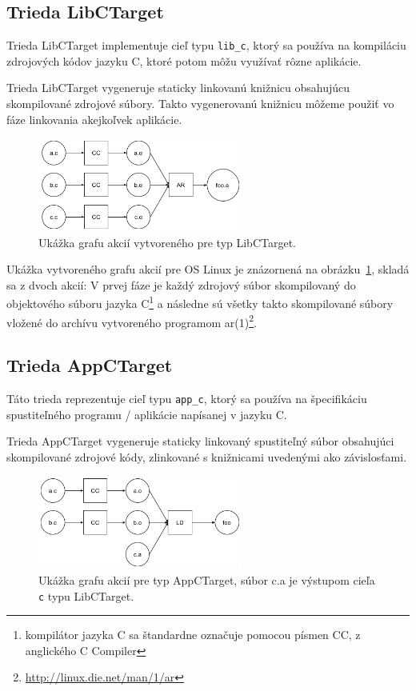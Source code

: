 \subsection{Trieda LibCTarget}
\label{sec:master:libctarget}

Trieda LibCTarget implementuje cieľ typu \verb!lib_c!, ktorý sa používa na
kompiláciu zdrojových kódov jazyku C, ktoré potom môžu využívať rôzne aplikácie.

Trieda LibCTarget vygeneruje staticky linkovanú knižnicu obsahujúcu skompilované
zdrojové súbory. Takto vygenerovanú knižnicu môžeme použiť vo fáze linkovania
akejkoľvek aplikácie.

\begin{figure}[h]
  \centerline{\includegraphics[width=0.6\textwidth]{images/libctarget}}
  \caption[Graf akcií pre typ LibCTarget]{Ukážka grafu akcií vytvoreného pre typ
  LibCTarget.}
  \label{img:libctarget}
\end{figure}


Ukážka vytvoreného grafu akcií pre OS Linux je znázornená na obrázku~\ref{img:libctarget},
skladá sa z dvoch akcií: V prvej fáze je každý zdrojový súbor skompilovaný
do objektového súboru jazyka C\footnote{kompilátor jazyka C sa štandardne označuje
pomocou písmen CC, z anglického C Compiler} a následne sú všetky takto skompilované súbory
vložené do archívu vytvoreného programom ar(1)\footnote{\url{http://linux.die.net/man/1/ar}}.

\subsection{Trieda AppCTarget}
\label{sec:master:appctarget}

Táto trieda reprezentuje cieľ typu \verb!app_c!, ktorý sa používa na špecifikáciu
spustiteľného programu / aplikácie napísanej v jazyku C.

Trieda AppCTarget vygeneruje staticky linkovaný spustiteľný súbor obsahujúci
skompilované zdrojové kódy, zlinkované s knižnicami uvedenými ako závislosťami.

\begin{figure}[h]
  \centerline{\includegraphics[width=0.6\textwidth]{images/appctarget}}
  \caption[Graf akcií pre typ AppCTarget]{Ukážka grafu akcií pre typ AppCTarget,
  súbor c.a je výstupom cieľa \texttt{c} typu LibCTarget.}
  \label{img:appctarget}
\end{figure}

